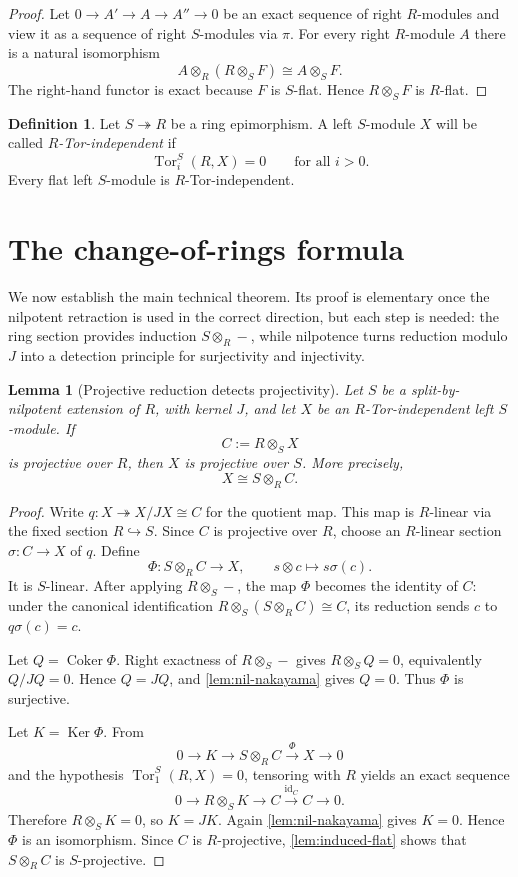 \documentclass[11pt,reqno]{amsart}
\newcommand{\Tor}{\operatorname{Tor}}
\newcommand{\Coker}{\operatorname{Coker}}
\newcommand{\Ker}{\operatorname{Ker}}
\newcommand{\id}{\operatorname{id}}
\theoremstyle{plain}
\newtheorem{lemma}[lemma]{Lemma}
\theoremstyle{definition}
\newtheorem{definition}[definition]{Definition}
\theoremstyle{remark}
\begin{document}
\begin{proof}
Let $0\to A'\to A\to A''\to0$ be an exact sequence of right $R$-modules and view
it as a sequence of right $S$-modules via $\pi$.  For every right $R$-module $A$
there is a natural isomorphism
\[
 A\otimes_R(R\otimes_SF)\cong A\otimes_SF.
\]
The right-hand functor is exact because $F$ is $S$-flat.  Hence
$R\otimes_SF$ is $R$-flat.
\end{proof}

\begin{definition}\label{def:torind}
Let $S\twoheadrightarrow R$ be a ring epimorphism.  A left $S$-module $X$ will be
called \emph{$R$-Tor-independent} if
\[
   \Tor_i^S(R,X)=0\qquad\text{for all }i>0.
\]
Every flat left $S$-module is $R$-Tor-independent.
\end{definition}

\section{The change-of-rings formula}

We now establish the main technical theorem.  Its proof is elementary once the
nilpotent retraction is used in the correct direction, but each step is needed: the
ring section provides induction $S\otimes_R-$, while nilpotence turns reduction
modulo $J$ into a detection principle for surjectivity and injectivity.

\begin{lemma}[Projective reduction detects projectivity]\label{lem:base-projective}
Let $S$ be a split-by-nilpotent extension of $R$, with kernel $J$, and let $X$ be an
$R$-Tor-independent left $S$-module.  If
\[
   C:=R\otimes_SX
\]
is projective over $R$, then $X$ is projective over $S$.  More precisely,
\[
   X\cong S\otimes_RC.
\]
\end{lemma}

\begin{proof}
Write $q:X\twoheadrightarrow X/JX\cong C$ for the quotient map.  This map is
$R$-linear via the fixed section $R\hookrightarrow S$.  Since $C$ is projective over
$R$, choose an $R$-linear section $\sigma:C\to X$ of $q$.  Define
\[
  \Phi:S\otimes_RC\longrightarrow X,
  \qquad s\otimes c\longmapsto s\sigma(c).
\]
It is $S$-linear.  After applying $R\otimes_S-$, the map $\Phi$ becomes the identity
of $C$: under the canonical identification
$R\otimes_S(S\otimes_RC)\cong C$, its reduction sends $c$ to $q\sigma(c)=c$.

Let $Q=\Coker\Phi$.  Right exactness of $R\otimes_S-$ gives
$R\otimes_SQ=0$, equivalently $Q/JQ=0$.  Hence $Q=JQ$, and
\cref{lem:nil-nakayama} gives $Q=0$.  Thus $\Phi$ is surjective.

Let $K=\Ker\Phi$.  From
\[
 0\longrightarrow K\longrightarrow S\otimes_RC
 \xrightarrow{\Phi}X\longrightarrow0
\]
and the hypothesis $\Tor_1^S(R,X)=0$, tensoring with $R$ yields an exact sequence
\[
 0\longrightarrow R\otimes_SK\longrightarrow C
 \xrightarrow{\id_C}C\longrightarrow0.
\]
Therefore $R\otimes_SK=0$, so $K=JK$.  Again
\cref{lem:nil-nakayama} gives $K=0$.  Hence $\Phi$ is an isomorphism.  Since $C$
is $R$-projective, \cref{lem:induced-flat} shows that $S\otimes_RC$ is
$S$-projective.
\end{proof}
\end{document}
